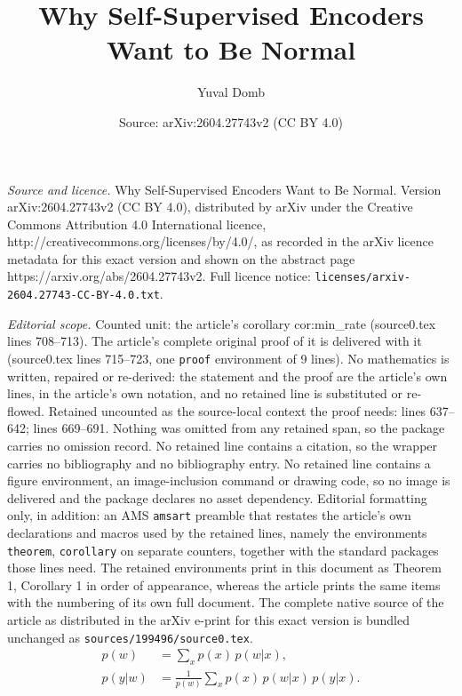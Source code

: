 \documentclass[10pt,a4paper]{amsart}
\title{Why Self-Supervised Encoders Want to Be Normal}
\author{Yuval Domb}
\date{Source: arXiv:2604.27743v2 (CC BY 4.0)}
\begin{document}
\maketitle

\noindent\emph{Source and licence.} Why Self-Supervised Encoders Want to Be Normal. Version arXiv:2604.27743v2 (CC BY 4.0), distributed by arXiv under the Creative Commons Attribution 4.0 International licence, http://creativecommons.org/licenses/by/4.0/, as recorded in the arXiv licence metadata for this exact version and shown on the abstract page https://arxiv.org/abs/2604.27743v2. Full licence notice: \texttt{licenses/arxiv-2604.27743-CC-BY-4.0.txt}.\par\smallskip

\noindent\textit{Editorial scope.} Counted unit: the article's corollary cor:min\_rate (source0.tex lines 708--713). The article's complete original proof of it is delivered with it (source0.tex lines 715--723, one \texttt{proof} environment of 9 lines). No mathematics is written, repaired or re-derived: the statement and the proof are the article's own lines, in the article's own notation, and no retained line is substituted or re-flowed.  Retained uncounted as the source-local context the proof needs: lines 637--642; lines 669--691.  Nothing was omitted from any retained span, so the package carries no omission record.  No retained line contains a citation, so the wrapper carries no bibliography and no bibliography entry.  No retained line contains a figure environment, an image-inclusion command or drawing code, so no image is delivered and the package declares no asset dependency.  Editorial formatting only, in addition: an AMS \texttt{amsart} preamble that restates the article's own declarations and macros used by the retained lines, namely the environments \texttt{theorem}, \texttt{corollary} on separate counters, together with the standard packages those lines need.  The retained environments print in this document as Theorem 1, Corollary 1 in order of appearance, whereas the article prints the same items with the numbering of its own full document.  The complete native source of the article as distributed in the arXiv e-print for this exact version is bundled unchanged as \texttt{sources/199496/source0.tex}.
\begin{align}
    p(w) &= \sum_x p(x)\,p(w|x),
    \label{eq:marginal}\\
    p(y|w) &= \frac{1}{p(w)}\sum_x p(x)\,p(w|x)\,p(y|x).
    \label{eq:decoder}
\end{align}
\end{document}
